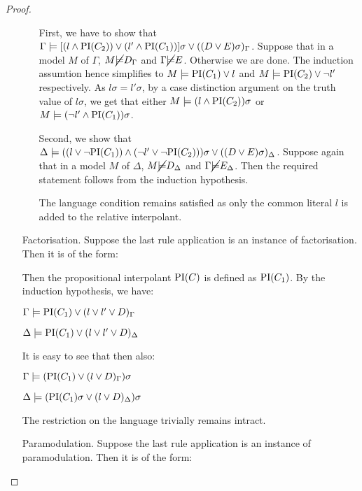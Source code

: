 \begin{proof}
\begin{itemize}
\begin{enumerate}
					First, we have to show that 
					$ \Gamma \models [(l \land \mathrm{PI}(C_2)) \lor (l' \land \mathrm{PI}(C_1)) ]\sigma \lor ((D \lor E)\sigma)_\Gamma$.
					Suppose that in a model $M$ of $\Gamma$, $M \cancel {\models} D_\Gamma$ and $\Gamma \cancel {\models} E$. Otherwise we are done.
					The induction assumtion hence simplifies to $M \models \mathrm{PI}(C_1) \lor l$ and $M \models \mathrm{PI}(C_2) \lor \lnot l'$ respectively.
					As $l\sigma = l'\sigma$, by a case distinction argument on the truth value of $l\sigma$, we get that either $M \models (l \land \mathrm{PI}(C_2))\sigma$ or $M \models  (\lnot l' \land \mathrm{PI}(C_1))\sigma$.


					Second, we show that 
					$\Delta \models ((l \lor \lnot \mathrm{PI}(C_1)) \land (\lnot l' \lor \lnot \mathrm{PI}(C_2)))\sigma \lor ((D \lor E)\sigma)_\Delta$.
					Suppose again that in a model $M$ of $\Delta$, $M \cancel {\models} D_\Delta$ and $\Gamma \cancel {\models} E_\Delta$. 
					Then the required statement follows from the induction hypothesis.
					
					The language condition remains satisfied as only the common literal $l$ is added to the relative interpolant.


			\end{enumerate}

		\item[Factorisation.]	
			Suppose the last rule application is an instance of factorisation. Then it is of the form:
			\begin{prooftree}
			\end{prooftree}

			Then the propositional interpolant $\mathrm{PI}(C)$ is defined as $\mathrm{PI}(C_1)$.
			By the induction hypothesis, we have:

			$\Gamma \models \mathrm{PI}(C_1) \lor (l \lor l' \lor D)_\Gamma$

			$\Delta \models \mathrm{PI}(C_1) \lor (l \lor l' \lor D)_\Delta$

			It is easy to see that then also:

			$\Gamma \models (\mathrm{PI}(C_1)\lor (l \lor D)_\Gamma)\sigma$

			$\Delta \models (\mathrm{PI}(C_1)\sigma \lor (l \lor D)_\Delta)\sigma$

			The restriction on the language trivially remains intract.
			

		\item[Paramodulation.]	
			Suppose the last rule application is an instance of paramodulation. Then it is of the form:


\end{itemize}
\end{proof}
